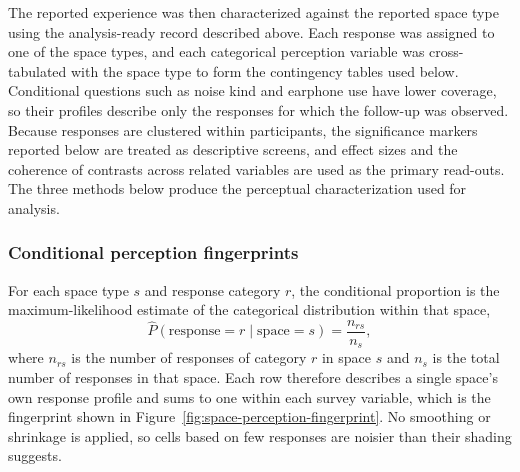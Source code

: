\documentclass[]{interact}
\begin{document}


The reported experience was then characterized against the reported space type using the analysis-ready record described above.
Each response was assigned to one of the space types, and each categorical perception variable was cross-tabulated with the space type to form the contingency tables used below.
Conditional questions such as noise kind and earphone use have lower coverage, so their profiles describe only the responses for which the follow-up was observed.
Because responses are clustered within participants, the significance markers reported below are treated as descriptive screens, and effect sizes and the coherence of contrasts across related variables are used as the primary read-outs. The three methods below produce the perceptual characterization used for analysis.

\subsubsection{Conditional perception fingerprints}\label{sec:methods-fingerprint}
For each space type $s$ and response category $r$, the conditional proportion is the maximum-likelihood estimate of the categorical distribution within that space,
\begin{equation}
\hat{P}(\mathrm{response}=r \mid \mathrm{space}=s) = \frac{n_{rs}}{n_{s}},
\end{equation}
where $n_{rs}$ is the number of responses of category $r$ in space $s$ and $n_{s}$ is the total number of responses in that space.
Each row therefore describes a single space's own response profile and sums to one within each survey variable, which is the fingerprint shown in Figure~\ref{fig:space-perception-fingerprint}.
No smoothing or shrinkage is applied, so cells based on few responses are noisier than their shading suggests.
\end{document}
